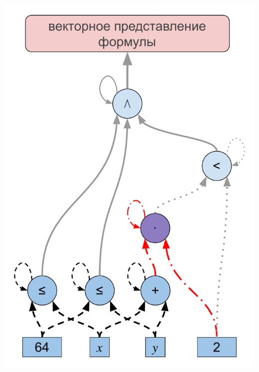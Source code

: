 \documentclass[14pt,aspectratio=169,hyperref={pdftex,unicode},xcolor=dvipsnames]{beamer}
\begin{document}
\begin{frame}[noframenumbering]

\begin{center}
  \includegraphics[scale=0.45]{./assets/formula-ast-talk-2.pdf}
\end{center}

\end{frame}
\end{document}
